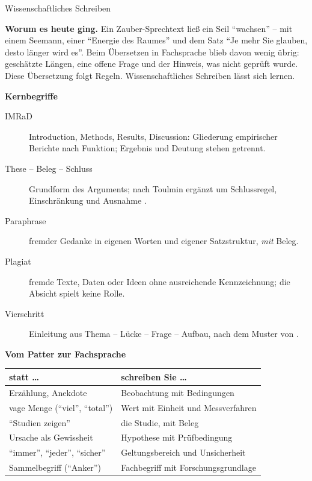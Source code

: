 \begin{handout}{Wissenschaftliches Schreiben}

\textbf{Worum es heute ging.} Ein Zauber-Sprechtext ließ ein Seil
\enquote{wachsen} -- mit einem Seemann, einer \enquote{Energie des Raumes}
und dem Satz \enquote{Je mehr Sie glauben, desto länger wird es}. Beim
Übersetzen in Fachsprache blieb davon wenig übrig: geschätzte Längen,
eine offene Frage und der Hinweis, was nicht geprüft wurde. Diese
Übersetzung folgt Regeln. Wissenschaftliches Schreiben lässt sich lernen.

\textbf{Kernbegriffe}
\begin{description}
  \item[IMRaD] Introduction, Methods, Results, Discussion: Gliederung
    empirischer Berichte nach Funktion; Ergebnis und Deutung stehen getrennt.
  \item[These -- Beleg -- Schluss] Grundform des Arguments; nach Toulmin
    ergänzt um Schlussregel, Einschränkung und Ausnahme
    \parencite{toulmin1958uses}.
  \item[Paraphrase] fremder Gedanke in eigenen Worten und eigener
    Satzstruktur, \emph{mit} Beleg.
  \item[Plagiat] fremde Texte, Daten oder Ideen ohne ausreichende
    Kennzeichnung; die Absicht spielt keine Rolle.
  \item[Vierschritt] Einleitung aus Thema -- Lücke -- Frage -- Aufbau,
    nach dem Muster von \textcite{swales1990genre}.
\end{description}

\textbf{Vom Patter zur Fachsprache}

\begin{center}\small
\begin{tabular}{p{}p{}}
\toprule
\textbf{statt \ldots} & \textbf{schreiben Sie \ldots} \\
\midrule
Erzählung, Anekdote & Beobachtung mit Bedingungen \\
vage Menge (\enquote{viel}, \enquote{total}) & Wert mit Einheit und Messverfahren \\
\enquote{Studien zeigen} & die Studie, mit Beleg \\
Ursache als Gewissheit & Hypothese mit Prüfbedingung \\
\enquote{immer}, \enquote{jeder}, \enquote{sicher} & Geltungsbereich und Unsicherheit \\
Sammelbegriff (\enquote{Anker}) & Fachbegriff mit Forschungsgrundlage \\
\bottomrule
\end{tabular}
\end{center}


\end{handout}
